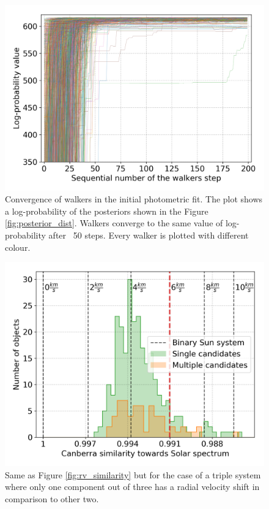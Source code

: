 \begin{figure}
	\centering
	\includegraphics[width=\columnwidth]{150408004101169_p1884_lnprob_3star_0.png}
	\caption{Convergence of walkers in the initial photometric fit. The plot shows a log-probability of the posteriors shown in the Figure \ref{fig:posterior_dist}. Walkers converge to the same value of log-probability after ~50 steps. Every walker is plotted with different colour.}
	\label{fig:walkers_logprob}
\end{figure}

\begin{figure}
	\centering
	\includegraphics[width=\columnwidth]{sinlg_multi_sim_b3_66_6_33_3.png}
	\caption{Same as Figure \ref{fig:rv_similarity} but for the case of a triple system where only one component out of three has a radial velocity shift in comparison to other two.}
	\label{fig:rv_similarity_2}
\end{figure}

